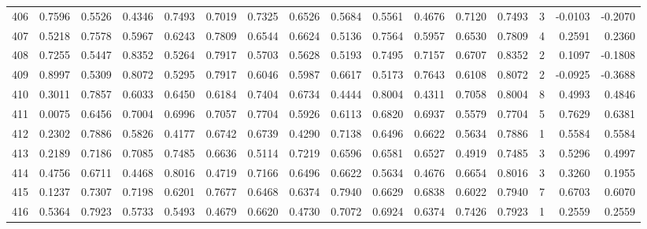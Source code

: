 \begin{tabular}{lrrrrrrrrrrrrrrr}
406 &      0.7596 &  0.5526 &  0.4346 &  0.7493 &  0.7019 &  0.7325 &  0.6526 &  0.5684 &  0.5561 &  0.4676 &   0.7120 &     0.7493 &      3 &                   -0.0103 &                    -0.2070 \\
407 &      0.5218 &  0.7578 &  0.5967 &  0.6243 &  0.7809 &  0.6544 &  0.6624 &  0.5136 &  0.7564 &  0.5957 &   0.6530 &     0.7809 &      4 &                    0.2591 &                     0.2360 \\
408 &      0.7255 &  0.5447 &  0.8352 &  0.5264 &  0.7917 &  0.5703 &  0.5628 &  0.5193 &  0.7495 &  0.7157 &   0.6707 &     0.8352 &      2 &                    0.1097 &                    -0.1808 \\
409 &      0.8997 &  0.5309 &  0.8072 &  0.5295 &  0.7917 &  0.6046 &  0.5987 &  0.6617 &  0.5173 &  0.7643 &   0.6108 &     0.8072 &      2 &                   -0.0925 &                    -0.3688 \\
410 &      0.3011 &  0.7857 &  0.6033 &  0.6450 &  0.6184 &  0.7404 &  0.6734 &  0.4444 &  0.8004 &  0.4311 &   0.7058 &     0.8004 &      8 &                    0.4993 &                     0.4846 \\
411 &      0.0075 &  0.6456 &  0.7004 &  0.6996 &  0.7057 &  0.7704 &  0.5926 &  0.6113 &  0.6820 &  0.6937 &   0.5579 &     0.7704 &      5 &                    0.7629 &                     0.6381 \\
412 &      0.2302 &  0.7886 &  0.5826 &  0.4177 &  0.6742 &  0.6739 &  0.4290 &  0.7138 &  0.6496 &  0.6622 &   0.5634 &     0.7886 &      1 &                    0.5584 &                     0.5584 \\
413 &      0.2189 &  0.7186 &  0.7085 &  0.7485 &  0.6636 &  0.5114 &  0.7219 &  0.6596 &  0.6581 &  0.6527 &   0.4919 &     0.7485 &      3 &                    0.5296 &                     0.4997 \\
414 &      0.4756 &  0.6711 &  0.4468 &  0.8016 &  0.4719 &  0.7166 &  0.6496 &  0.6622 &  0.5634 &  0.4676 &   0.6654 &     0.8016 &      3 &                    0.3260 &                     0.1955 \\
415 &      0.1237 &  0.7307 &  0.7198 &  0.6201 &  0.7677 &  0.6468 &  0.6374 &  0.7940 &  0.6629 &  0.6838 &   0.6022 &     0.7940 &      7 &                    0.6703 &                     0.6070 \\
416 &      0.5364 &  0.7923 &  0.5733 &  0.5493 &  0.4679 &  0.6620 &  0.4730 &  0.7072 &  0.6924 &  0.6374 &   0.7426 &     0.7923 &      1 &                    0.2559 &                     0.2559 \\

\end{tabular}
